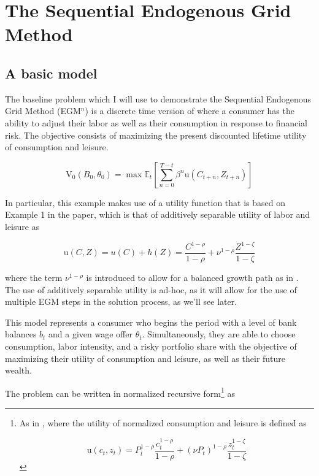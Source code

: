 \documentclass{article}
\newcommand{\DiscFac}{\beta}
\newcommand{\utilFunc}{\mathrm{u}}
\newcommand{\VFunc}{\mathrm{V}}
\newcommand{\Leisure}{Z}
\newcommand{\util}{u}
\newcommand{\tShkEmp}{\theta}
\newcommand{\BLev}{B}
\newcommand{\CLev}{C}
\newcommand{\Ex}{\mathbb{E}}
\newcommand{\CRRA}{\rho}
\newcommand{\labShare}{\nu}
\newcommand{\leiShare}{\zeta}
\newcommand{\h}{h}
\newcommand{\bRat}{b}
\newcommand{\leisure}{z}
\newcommand{\cRat}{c}
\newcommand{\PLev}{P}
\begin{document}
\section{The Sequential Endogenous Grid Method}\label{method}

\subsection{A basic model}\label{A basic model}

The baseline problem which I will use to demonstrate the Sequential Endogenous Grid Method (EGM$^n$) is a discrete time version of \citet{Bodie1992} where a consumer has the ability to adjust their labor as well as their consumption in response to financial risk. The objective consists of maximizing the present discounted lifetime utility of consumption and leisure.

\begin{equation}
\VFunc_0(\BLev_0, \tShkEmp_0) = \max \Ex_{t} \left[ \sum_{n = 0}^{T-t} \DiscFac^{n} \utilFunc(\CLev_{t+n}, \Leisure_{t+n})  \right]
\end{equation}

In particular, this example makes use of a utility function that is based on Example 1 in the paper, which is that of additively separable utility of labor and leisure as

\begin{equation}
\utilFunc(\CLev, \Leisure) = \util(\CLev) + \h(\Leisure) = \frac{C^{1-\CRRA}}{1-\CRRA} + \labShare^{1-\CRRA} \frac{\Leisure^{1-\leiShare}}{1-\leiShare}
\end{equation}

where the term $\labShare^{1 -\CRRA}$ is introduced to allow for a balanced growth path as in \citet{Mertens2011}. The use of additively separable utility is ad-hoc, as it will allow for the use of multiple EGM steps in the solution process, as we'll see later.

This model represents a consumer who begins the period with a level of bank balances $\bRat_{t}$ and a given wage offer $\tShkEmp_{t}$. Simultaneously, they are able to choose consumption, labor intensity, and a risky portfolio share with the objective of maximizing their utility of consumption and leisure, as well as their future wealth.

The problem can be written in normalized recursive form\footnote{As in \citet{Carroll2009}, where the utility of normalized consumption and leisure is defined as

\begin{equation}
\utilFunc(\cRat_{t}, \leisure_{t}) = \PLev_{t}^{1-\CRRA} \frac{\cRat_{t}^{1-\CRRA}}{1-\CRRA} + (\labShare\PLev_{t})^{1-\CRRA} \frac{\leisure_{t}^{1-\leiShare}}{1-\leiShare}
\end{equation}} as
\end{document}
